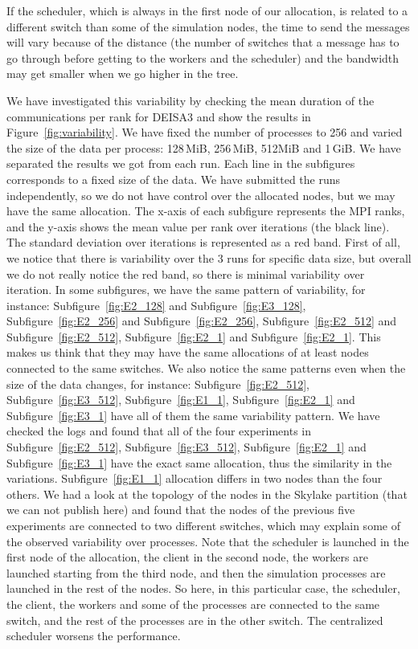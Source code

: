 If the scheduler, which is always in the first node of our allocation, is related to a different switch than some of the simulation nodes, the time to send the messages will vary because of the distance (the number of switches that a message has to go through before getting to the workers and the scheduler) and the bandwidth may get smaller when we go higher in the tree. 

We have investigated this variability by checking the mean duration of the communications per rank for DEISA3 and show the results in Figure~\ref{fig:variability}.
We have fixed the number of processes to 256 and varied the size of the data per process: 128\,MiB, 256\,MiB, 512MiB and 1\,GiB. We have separated the results we got from each run. Each line in the subfigures corresponds to a fixed size of the data. 
We have submitted the runs independently, so we do not have control over the allocated nodes, but we may have the same allocation. 
The x-axis of each subfigure represents the MPI ranks, and the y-axis shows the mean value per rank over iterations (the black line). The standard deviation over iterations is represented as a red band. 
First of all, we notice that there is variability over the 3 runs for specific data size, but overall we do not really notice the red band, so there is minimal variability over iteration. 
In some subfigures, we have the same pattern of variability, for instance: 
Subfigure~\ref{fig:E2_128} and Subfigure~\ref{fig:E3_128}, Subfigure~\ref{fig:E2_256} and Subfigure~\ref{fig:E2_256}, Subfigure~\ref{fig:E2_512} and Subfigure~\ref{fig:E2_512}, 
Subfigure~\ref{fig:E2_1} and Subfigure~\ref{fig:E2_1}. 
This makes us think that they may have the same allocations of at least nodes connected to the same switches. 
We also notice the same patterns even when the size of the data changes, for instance: Subfigure~\ref{fig:E2_512}, Subfigure~\ref{fig:E3_512}, Subfigure~\ref{fig:E1_1}, Subfigure~\ref{fig:E2_1} and Subfigure~\ref{fig:E3_1} have all of them the same variability pattern. 
We have checked the logs and found that all of the four experiments in  Subfigure~\ref{fig:E2_512}, Subfigure~\ref{fig:E3_512}, Subfigure~\ref{fig:E2_1} and Subfigure~\ref{fig:E3_1} have the exact same allocation, thus the similarity in the variations. Subfigure~\ref{fig:E1_1} allocation differs in two nodes than the four others.
We had a look at the topology of the nodes in the Skylake partition (that we can not publish here) and found that the nodes of the previous five experiments are connected to two different switches, which may explain some of the observed variability over processes. 
Note that the scheduler is launched in the first node of the allocation, the client in the second node, the workers are launched starting from the third node, and then the simulation processes are launched in the rest of the nodes. So here, in this particular case, the scheduler, the client, the workers and some of the processes are connected to the same switch, and the rest of the processes are in the other switch. The centralized scheduler worsens the performance.

